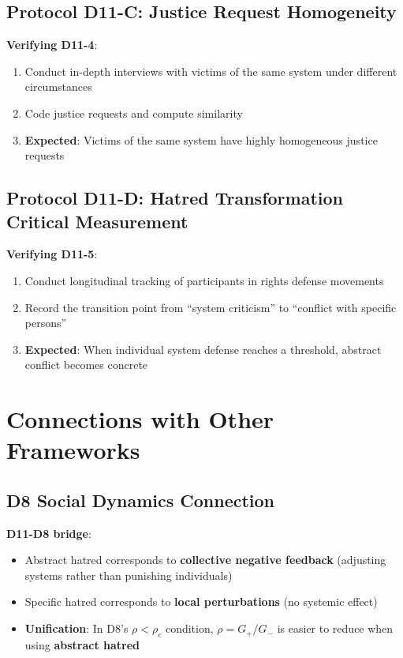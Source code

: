 \documentclass[12pt,a4paper]{article}
\begin{document}
\subsection{Protocol D11-C: Justice Request Homogeneity}

\textbf{Verifying D11-4}:
\begin{enumerate}
    \item Conduct in-depth interviews with victims of the same system under different circumstances
    \item Code justice requests and compute similarity
    \item \textbf{Expected}: Victims of the same system have highly homogeneous justice requests
\end{enumerate}

\subsection{Protocol D11-D: Hatred Transformation Critical Measurement}

\textbf{Verifying D11-5}:
\begin{enumerate}
    \item Conduct longitudinal tracking of participants in rights defense movements
    \item Record the transition point from ``system criticism'' to ``conflict with specific persons''
    \item \textbf{Expected}: When individual system defense reaches a threshold, abstract conflict becomes concrete
\end{enumerate}

\section{Connections with Other Frameworks}

\subsection{D8 Social Dynamics Connection}

\textbf{D11-D8 bridge}:
\begin{itemize}
    \item Abstract hatred corresponds to \textbf{collective negative feedback} (adjusting systems rather than punishing individuals)
    \item Specific hatred corresponds to \textbf{local perturbations} (no systemic effect)
    \item \textbf{Unification}: In D8's $\rho < \rho_c$ condition, $\rho = G_+/G_-$ is easier to reduce when using \textbf{abstract hatred}
\end{itemize}
\end{document}
